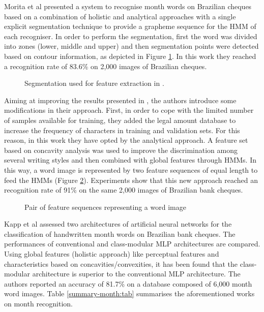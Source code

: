 \documentclass{article}[14pt, oneside, a4paper, times]
\begin{document}
Morita et al \cite{Morita2000} presented a system to recognise month words on Brazilian cheques based on a combination of holistic and analytical approaches with a single explicit segmentation technique to provide a grapheme sequence for the HMM of each recogniser. In order to perform the segmentation, first the word was divided into zones (lower, middle and upper) and then segmentation points were detected based on contour information, as depicted in Figure \ref{featureextraction:fig}. In this work they reached a recognition rate of 83.6\% on 2,000 images of Brazilian cheques.

\begin{figure}[htbp]
   \centering
   \caption{Segmentation used for feature extraction in \cite{Morita2000}.}
   \label{featureextraction:fig}
\end{figure}


Aiming at improving the results presented in \cite{Morita2000}, the authors \cite{Morita2001,Morita2004} introduce some modifications in their approach. First, in order to cope with the limited number of samples available for training, they added the legal amount database to increase the frequency of characters in training and validation sets. For this reason, in this work they have opted by the analytical approach. A feature set based on concavity analysis was used to improve the discrimination among several writing styles and then combined with global features through HMMs. In this way, a word image is represented by two feature sequences of equal length to feed the HMMs (Figure \ref{twosequences:fig}). Experiments show that this new approach reached an recognition rate of 91\% on the same 2,000 images of Brazilian bank cheques.

\begin{figure}[htbp]
   \centering
   \caption{Pair of feature sequences representing a word image \cite{Morita2001}}
   \label{twosequences:fig}
\end{figure}


Kapp et al \cite{Kapp2007} assessed two architectures of artificial neural networks for the classification of handwritten month words on Brazilian bank cheques. The performances of conventional and class-modular MLP architectures are compared. Using global features (holistic approach) like perceptual features and characteristics based on concavities/convexities, it has been found that the class-modular architecture is superior to the conventional MLP architecture. The authors reported an accuracy of 81.7\% on a database composed of 6,000 month word images.  Table \ref{summary-month:tab} summarises the aforementioned works on month recognition. 
\end{document}
